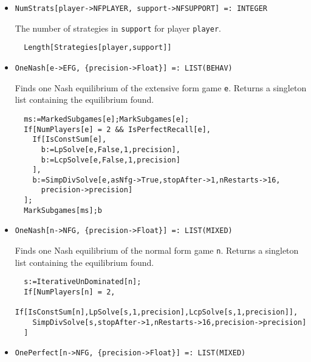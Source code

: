 \begin{itemize}
\item{}
\protect \large \begin{verbatim}
NumStrats[player->NFPLAYER, support->NFSUPPORT] =: INTEGER 
\end{verbatim}\normalsize

\bd 
The number of strategies in \verb+support+ for player \verb+player+.
\begin{verbatim}
  Length[Strategies[player,support]] 
\end{verbatim} 
\ed


\item{}
\protect \large \begin{verbatim}
OneNash[e->EFG, {precision->Float}] =: LIST(BEHAV) 
\end{verbatim}\normalsize

\bd 
Finds one Nash equilibrium of the extensive form game \verb+e+.
Returns a singleton list containing the equilibrium found.

\begin{verbatim}
  ms:=MarkedSubgames[e];MarkSubgames[e];
  If[NumPlayers[e] = 2 && IsPerfectRecall[e],
    If[IsConstSum[e],
      b:=LpSolve[e,False,1,precision],
      b:=LcpSolve[e,False,1,precision]
    ],
    b:=SimpDivSolve[e,asNfg->True,stopAfter->1,nRestarts->16,
      precision->precision]
  ];
  MarkSubgames[ms];b
\end{verbatim} 
\ed

\item{}
\protect \large \begin{verbatim}
OneNash[n->NFG, {precision->Float}] =: LIST(MIXED) 
\end{verbatim}\normalsize

\bd 
Finds one Nash equilibrium of the normal form game \verb+n+.
Returns a singleton list containing the equilibrium found.

\begin{verbatim}
  s:=IterativeUnDominated[n];
  If[NumPlayers[n] = 2,
    If[IsConstSum[n],LpSolve[s,1,precision],LcpSolve[s,1,precision]],
    SimpDivSolve[s,stopAfter->1,nRestarts->16,precision->precision]
  ]
\end{verbatim} 
\ed

\item{}
\protect \large \begin{verbatim}
OnePerfect[n->NFG, {precision->Float}] =: LIST(MIXED) 
\end{verbatim}\normalsize


\end{itemize}
